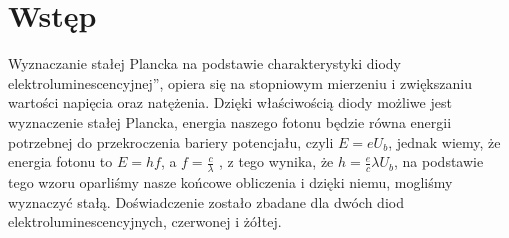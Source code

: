 \section{Wstęp}
Wyznaczanie stałej Plancka na podstawie charakterystyki diody elektroluminescencyjnej”, opiera się na stopniowym mierzeniu i zwiększaniu wartości napięcia oraz natężenia.
Dzięki właściwością diody możliwe jest wyznaczenie stałej Plancka, energia naszego fotonu będzie równa energii potrzebnej do przekroczenia bariery potencjału, czyli $E=eU_b$, jednak wiemy, że energia fotonu to $E=hf$, a $f=\frac{c}{\lambda}$ , z tego wynika, że $h=\frac{e}{c}\lambda U_b$, na podstawie tego wzoru oparliśmy nasze końcowe obliczenia i dzięki niemu, mogliśmy wyznaczyć stałą.
Doświadczenie zostało zbadane dla dwóch diod elektroluminescencyjnych, czerwonej i żółtej.